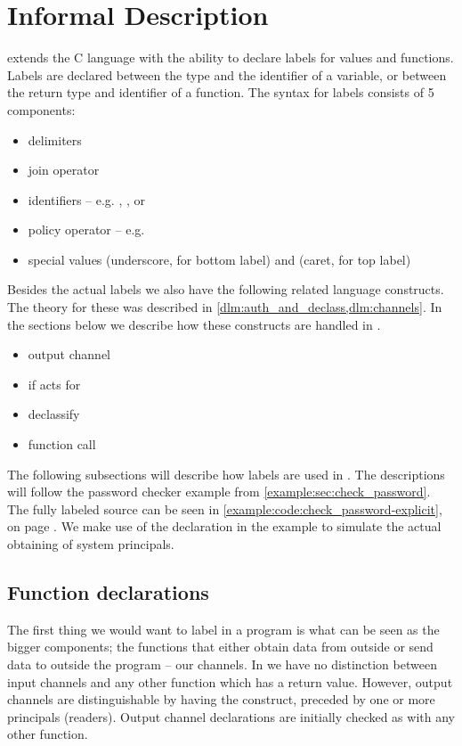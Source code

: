 \section{Informal Description}\label{ctif:informal}
\thelang{} extends the C language with the ability to declare labels for values and functions.
Labels are declared between the type and the identifier of a variable, or between the return type and identifier of a function.
The syntax for labels consists of 5 components:
\begin{itemize}
  \item delimiters \dlmc{\{\{ \}\}}
  \item join operator \dlmc{;}
  \item identifiers -- e.g. , , or 
  \item policy operator \dlmc{->} -- e.g. 
  \item special values \dlmc{_} (underscore, for bottom label) and \dlmc{^} (caret, for top label)
\end{itemize}

Besides the actual labels we also have the following related language constructs.
The theory for these was described in \cref{dlm:auth_and_declass,dlm:channels}.
In the sections below we describe how these constructs are handled in \thelang.

\begin{itemize}
  \item output channel 
  \item if acts for 
  \item declassify 
  \item function call 
\end{itemize}

The following subsections will describe how labels are used in \thelang.
The descriptions will follow the password checker example from \cref{example:sec:check_password}.
The fully labeled source can be seen in \cref{example:code:check_password-explicit}, on page \pageref{example:code:check_password-explicit}.
We make use of the  declaration in the example to simulate the actual obtaining of system principals.

\subsection{Function declarations}
The first thing we would want to label in a program is what can be seen as the bigger components; the functions that either obtain data from outside or send data to outside the program -- our channels.
In \thelang{} we have no distinction between input channels and any other function which has a return value.
However, output channels are distinguishable by having the \dlmc{<-} construct, preceded by one or more principals (readers).
Output channel declarations are initially checked as with any other function.

